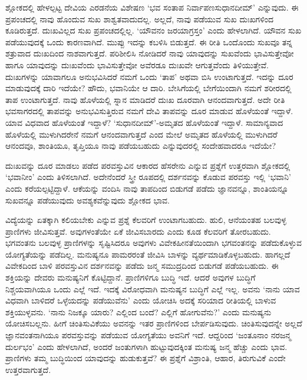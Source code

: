 ಶ್ಲೋಕದಲ್ಲಿ ಹೇಳಲ್ಪಟ್ಟ ದೇವಿಯ ಎರಡನೆಯ ವಿಶೇಷಣ `ಭವ ಸಂತಾಪ ನಿರ್ವಾಪಣಸುಧಾನದೀಮ್' ಎನ್ನುವುದು. ಈ ಪ್ರಪಂಚದಲ್ಲಿ 
ನಾವು ಹೊಂದುವ ಸುಖ ಶಾಶ್ವತವಾದುದಲ್ಲ. ಅಲ್ಲದೆ, ನಾವು ಪಡೆಯುವ ಸುಖ ದುಃಖಗಳಿಂದ ಕೂಡಿರುತ್ತದೆ. ದುಃಖವಿಲ್ಲದ 
ಸುಖ ಪ್ರಪಂಚದಲ್ಲಿಲ್ಲ. `ಯೌವನಂ ಜರಯಾಗ್ರಸ್ತಂ' ಎಂದು ಹೇಳಲಾಗಿದೆ. ಯೌವನ ಸುಖ ಪಡೆಯುವುದಕ್ಕೆ ಒಂದು 
ಕಾರಣವಾಗಿದೆ. ಮುಪ್ಪು ಇದನ್ನು ಕಬಳಿಸಿ ಬಿಡುತ್ತದೆ. ಈ ರೀತಿ ಒಂದೊಂದು ಸುಖವೂ ತನ್ನ ಶತ್ರುವಾದ ದುಃಖದಿಂದ 
ನಾಶವಾಗುತ್ತದೆ. ಪರಿಶೀಲಿಸಿ ನೋಡಿದರೆ ನಾವು ಯಾವುದನ್ನು ಸುಖವೆಂದು ಭಾವಿಸುತ್ತೇವೋ 
ಹಾಗೂ ಯಾವುದನ್ನು ದುಃಖವೆಂದು ಭಾವಿಸುತ್ತೇವೋ ಅವೆರಡೂ ದುಃಖವೇ ಆಗುತ್ತವೆಂದು ತಿಳಿಯುತ್ತೇವೆ. ದುಃಖಗಳನ್ನು 
ಯಾವಾಗಲೂ ಅನುಭವಿಸಿದರೆ ನಮಗೆ ಒಂದು `ತಾಪ' ಅಥವಾ ಬಿಸಿ ಉಂಟಾಗುತ್ತದೆ. ಇದನ್ನು ದೂರ 
ಮಾಡುವುದಕ್ಕೆ ದಾರಿ ಇದೆಯೇ? ಹೌದು, ಭವಾನಿಯೇ ಆ ದಾರಿ. ಬೇಸಿಗೆಯಲ್ಲಿ ಬೇಗೆಯಿಂದಾಗಿ 
ನಮಗೆ ಶರೀರದಲ್ಲಿ ತಾಪ ಉಂಟಾಗುತ್ತದೆ. ನಾವು ಹೊಳೆಯಲ್ಲಿ ಸ್ನಾನ ಮಾಡಿದರೆ ದುಃಖ ದೂರವಾಗಿ 
ಆನಂದವಾಗುತ್ತದೆ. ಅದೇ ರೀತಿ ಭವಸಾಗರದಲ್ಲಿ ತಾಪವನ್ನು ಅನುಭವಿಸುತ್ತಿರುವ ನಮಗೆ ದೇವಿ 
ತಾಪವನ್ನು ದೂರ ಮಾಡುವ ಹೊಳೆಯಂತೆ ಇದ್ದಾಳೆ. ಯಾವ ವಿಧವಾದ ಹೊಳೆಯಂತೆ ಇದ್ದಾಳೆ? 
`ಸುಧಾನದೀಮ್'-ಅಮೃತದ ಹೊಳೆಯಂತೆ ಇದ್ದಾಳೆ. ಸಾಮಾನ್ಯವಾದ ಹೊಳೆಯಲ್ಲಿ ಮುಳುಗಿದರೇನೆ 
ನಮಗೆ ಆನಂದವಾಗುತ್ತದೆ ಎಂದ ಮೇಲೆ ಅಮೃತದ ಹೊಳೆಯಲ್ಲಿ ಮುಳುಗಿದರೆ ಆನಂದವೂ, ಶಾಂತಿಯೂ, 
ತೃಪ್ತಿಯೂ ನಾವು ಪಡೆಯಬಹುದು ಎನ್ನುವುದರಲ್ಲಿ ಸಂದೇಹವಾದರೂ ಇದೆಯೇ?

ದುಃಖವನ್ನು ದೂರ ಮಾಡಲು ಪಡೆದ ಪರವಸ್ತುವಿನ ಆಕಾರದ ಹೆಸರೇನು ಎನ್ನುವ ಪ್ರಶ್ನೆಗೆ ಉತ್ತರವಾಗಿ ಶ್ಲೋಕದಲ್ಲಿ 
`ಭವಾನೀಂ' ಎಂದು ತಿಳಿಸಲಾಗಿದೆ. ಅದೇನೆಂದರೆ ಸ್ತ್ರೀ ರೂಪದಲ್ಲಿ ದರ್ಶನವನ್ನು ಕೊಡುವ ಪರವಸ್ತು ಇಲ್ಲಿ `ಭವಾನಿ' ಎಂದು 
ಕರೆಯಲ್ಪಟ್ಟಿದ್ದಾಳೆ. 
ಆಕೆಯನ್ನು ವಂದಿಸಿ ನಾವು ತಾಪದಿಂದ ಬಿಡುಗಡೆ ಪಡೆದು ಜ್ಞಾನವನ್ನೂ, ಶಾಂತಿಯನ್ನೂ ಸುಖವನ್ನೂ ಪಡೆಯುವುದು ಅವಶ್ಯಕವೆನ್ನುವುದು ಶ್ಲೋಕದ ಭಾವ.

ವಿದ್ಯೆಯನ್ನು ಏತಕ್ಕಾಗಿ ಕಲಿಯಬೇಕು ಎನ್ನುವ ಪ್ರಶ್ನೆ  ಕೆಲವರಿಗೆ ಉಂಟಾಗಬಹುದು. ಹುಲಿ, ಆನೆಯಂತಹ ಬಲವುಳ್ಳ ಪ್ರಾಣಿಗಳು ಜೀವಿಸುತ್ತವೆ. ಅವುಗಳಂತೆಯೇ 
ಏಕೆ ಜೀವಿಸಬಾರದು ಎಂದು ಕೂಡ ಕೆಲವರಿಗೆ ತೋರಬಹುದು. ಭಗವಂತನು ಬಲವುಳ್ಳ ಪ್ರಾಣಿಗಳನ್ನು ಸೃಷ್ಟಿಸಿದರೂ ಅವುಗಳು ವಿವೇಕಹೀನತೆಯಿಂದಾಗಿ 
ಭಗವಂತನನ್ನು ಪಡೆದುಕೊಳ್ಳುವ ಯೋಗ್ಯತೆಯನ್ನು ಪಡೆದಿಲ್ಲ. ಮನುಷ್ಯನೂ ಪಾಮರರಂತೆ ಜೀವಿಸಿ ಬಾಳನ್ನು ವ್ಯರ್ಥಮಾಡಿಕೊಳ್ಳಬಹುದು. 
ಹಾಗಲ್ಲದೆ ವಿವೇಕದಿಂದ ಬಾಳಿ ಪರವಸ್ತುವಿನ ದರ್ಶನವನ್ನು ಪಡೆದು ಜನ್ಮ ಸಮುದ್ರದಿಂದ ಬಿಡುಗಡೆ ಪಡೆಯಬಹುದು. ಈ ಶಕ್ತಿಯನ್ನು ದೇವರು 
ಮನುಷ್ಯನಿಗೆ ಕೊಟ್ಟಿದ್ದಾನೆ. ಪ್ರಾಣಿಗಳಿಗೂ ಬುದ್ಧಿ ಇದೆ. ಆದರೆ ಅವುಗಳ ಬುದ್ಧಿಗೆ ನಿಶ್ಚಯವಾಗಿಯೂ ಒಂದು ಎಲ್ಲೆ ಇದೆ. ಇದಕ್ಕೆ ವಿರೋಧವಾಗಿ 
ಮನುಷ್ಯನ ಬುದ್ಧಿಗೆ ಎಲ್ಲೆ ಇಲ್ಲ. ಅವನು `ನಾನು ಯಾವ ವಿಧವಾಗಿ ಬಾಳಿದರೆ ಒಳ್ಳೆಯದನ್ನು ಪಡೆಯುವೆನು' ಎಂದು ಯೋಚಿಸಿ ಅದಕ್ಕೆ ಸರಿಯಾದ 
ರೀತಿಯಲ್ಲಿ ಬಾಳುವ ಶಕ್ತಿಯುಳ್ಳವನು. `ನಾನು ನಿಜಕ್ಕೂ ಯಾರು? ಎಲ್ಲಿಂದ ಬಂದೆ? ಎಲ್ಲಿಗೆ ಹೋಗುವೆನು?' ಎಂದು ಮನುಷ್ಯನು ಯೋಚಿಸಬಲ್ಲನು. 
ಹೀಗೆ ಚಿಂತಿಸುವಿಕೆಯು ಅವನನ್ನು ಇತರ ಪ್ರಾಣಿಗಳಿಂದ ಬೇರ್ಪಡಿಸುವುದು. ಚಿಂತಿಸುವುದನ್ನೇ ಅಲ್ಲದೆ ಜ್ಞಾನವಂತನಾಗಿಯೂ ಪರವಸ್ತುವನ್ನು ಪಡೆಯುವ 
ಯೋಗ್ಯತೆಯು ಅವನಿಗೆ ಇದೆ. ಆದ್ದರಿಂದ `ಜಂತೂನಾಂ ನರಜನ್ಮ ದುರ್ಲಭಂ' ಎಂದು ಹೇಳಲಾಗಿದೆ, ಅಂದರೆ ಜಂತುಗಳಾಗಿ ಹುಟ್ಟುವುದಕ್ಕಿಂತ ಮನುಷ್ಯ 
ಜನ್ಮ ಹೆಚ್ಚು ಎಂದು ಭಾವ. ಪ್ರಾಣಿಗಳು ತಮ್ಮ ಬುದ್ಧಿಯಿಂದ ಯಾವುದನ್ನು ಹುಡುಕುತ್ತವೆ? ಈ ಪ್ರಶ್ನೆಗೆ ವಿಶ್ರಾಂತಿ, ಆಹಾರ, ತಿರುಗುವಿಕೆ ಎಂದೇ ಉತ್ತರವಾಗುತ್ತದೆ.

